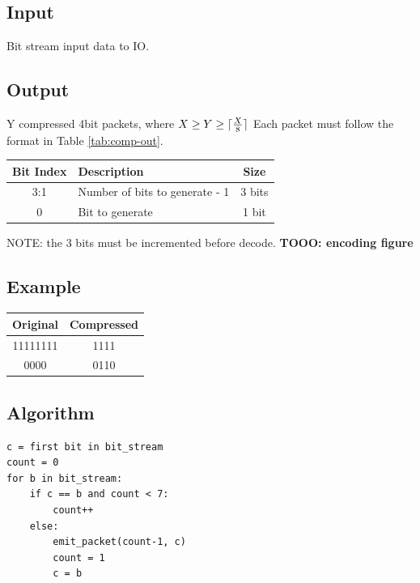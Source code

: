 \documentclass[12pt]{report}
\DeclarePairedDelimiter\ceil{\lceil}{\rceil}
\begin{document}
\subsection{Input}
Bit stream input data to IO.

\subsection{Output}
Y compressed 4bit packets, where $X \geq Y \geq \ceil{\frac{X}{8}}$
Each packet must follow the format in Table \ref{tab:comp-out}.

\begin{center}
 \begin{tabular}{||c |l |c||} 
 \hline
 Bit Index & Description & Size \\ [0.5ex] 
 \hline\hline
  3:1 & Number of bits to generate - 1 & 3 bits  \\ 
 \hline
 0  & Bit to generate &  1 bit \\ [1ex] 
 \hline
\end{tabular}
\end{center}
NOTE: the 3 bits must be incremented before decode.
\textbf{TOOO: encoding figure}

\subsection{Example}

\begin{center}
 \begin{tabular}{||c |c||} 
 \hline
 Original & Compressed \\ [0.5ex] 
 \hline\hline
  11111111 & 1111 \\ 
 \hline
 0000  & 0110 \\ [1ex] 
 \hline
\end{tabular}
\end{center}

\subsection{Algorithm}
\begin{verbatim}
c = first bit in bit_stream
count = 0
for b in bit_stream:
    if c == b and count < 7:
        count++
    else:
        emit_packet(count-1, c)
        count = 1
        c = b
\end{verbatim}
\end{document}
